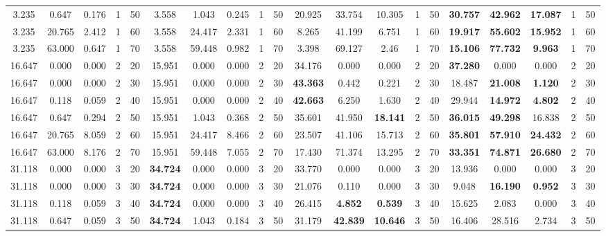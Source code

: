 \begin{table}[t]
{\begin{tabular}{|ccccc|ccccc|ccccc|ccccc|}
3.235 & 0.647 & 0.176 & 1 & 50 & 3.558 & 1.043 & 0.245 & 1 & 50 & 20.925 & 33.754 & 10.305 & 1 & 50 & \textbf{30.757} & \textbf{42.962} & \textbf{17.087} & 1 & 50 \\
3.235 & 20.765 & 2.412 & 1 & 60 & 3.558 & 24.417 & 2.331 & 1 & 60 & 8.265 & 41.199 & 6.751 & 1 & 60 & \textbf{19.917} & \textbf{55.602} & \textbf{15.952} & 1 & 60 \\
3.235 & 63.000 & 0.647 & 1 & 70 & 3.558 & 59.448 & 0.982 & 1 & 70 & 3.398 & 69.127 & 2.46 & 1 & 70 & \textbf{15.106} & \textbf{77.732} & \textbf{9.963} & 1 & 70 \\ \hline
16.647 & 0.000 & 0.000 & 2 & 20 & 15.951 & 0.000 & 0.000 & 2 & 20 & 34.176 & 0.000 & 0.000 & 2 & 20 & \textbf{37.280} & 0.000 & 0.000 & 2 & 20 \\
16.647 & 0.000 & 0.000 & 2 & 30 & 15.951 & 0.000 & 0.000 & 2 & 30 & \textbf{43.363} & 0.442 & 0.221 & 2 & 30 & 18.487 & \textbf{21.008} & \textbf{1.120} & 2 & 30 \\
16.647 & 0.118 & 0.059 & 2 & 40 & 15.951 & 0.000 & 0.000 & 2 & 40 & \textbf{42.663} & 6.250 & 1.630 & 2 & 40 & 29.944 & \textbf{14.972} & \textbf{4.802} & 2 & 40 \\
16.647 & 0.647 & 0.294 & 2 & 50 & 15.951 & 1.043 & 0.368 & 2 & 50 & 35.601 & 41.950 & \textbf{18.141} & 2 & 50 & \textbf{36.015} & \textbf{49.298} & 16.838 & 2 & 50 \\
16.647 & 20.765 & 8.059 & 2 & 60 & 15.951 & 24.417 & 8.466 & 2 & 60 & 23.507 & 41.106 & 15.713 & 2 & 60 & \textbf{35.801} & \textbf{57.910} & \textbf{24.432} & 2 & 60 \\
16.647 & 63.000 & 8.176 & 2 & 70 & 15.951 & 59.448 & 7.055 & 2 & 70 & 17.430 & 71.374 & 13.295 & 2 & 70 & \textbf{33.351} & \textbf{74.871} & \textbf{26.680} & 2 & 70 \\ \hline
31.118 & 0.000 & 0.000 & 3 & 20 & \textbf{34.724} & 0.000 & 0.000 & 3 & 20 & 33.770 & 0.000 & 0.000 & 3 & 20 & 13.936 & 0.000 & 0.000 & 3 & 20 \\
31.118 & 0.000 & 0.000 & 3 & 30 & \textbf{34.724} & 0.000 & 0.000 & 3 & 30 & 21.076 & 0.110 & 0.000 & 3 & 30 & 9.048 & \textbf{16.190} & \textbf{0.952} & 3 & 30 \\
31.118 & 0.118 & 0.059 & 3 & 40 & \textbf{34.724} & 0.000 & 0.000 & 3 & 40 & 26.415 & \textbf{4.852} & \textbf{0.539} & 3 & 40 & 15.625 & 2.083 & 0.000 & 3 & 40 \\
31.118 & 0.647 & 0.059 & 3 & 50 & \textbf{34.724} & 1.043 & 0.184 & 3 & 50 & 31.179 & \textbf{42.839} & \textbf{10.646} & 3 & 50 & 16.406 & 28.516 & 2.734 & 3 & 50 \\

\end{tabular}}
\end{table}
